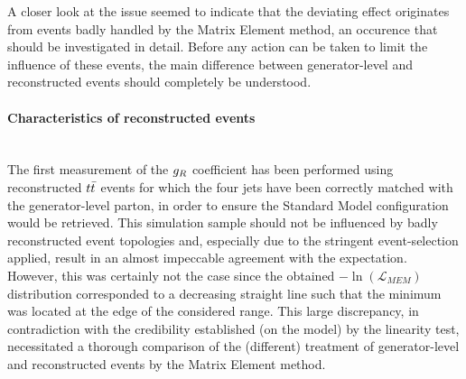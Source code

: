 A closer look at the issue seemed to indicate that the deviating effect originates from events badly handled by the Matrix Element method, an occurence that should be investigated in detail.
Before any action can be taken to limit the influence of these events, the main difference between generator-level and reconstructed events should completely be understood.
%

\paragraph{Characteristics of reconstructed events} \hfill \\ %

The first measurement of the $g_{R}$ coefficient has been performed using reconstructed $t\bar{t}$ events for which the four jets have been correctly matched with the generator-level parton, in order to ensure the Standard Model configuration would be retrieved. This simulation sample should not be influenced by badly reconstructed event topologies and, especially due to the stringent event-selection applied, result in an almost impeccable agreement with the expectation.
\\
However, this was certainly not the case since the obtained $-\ln(\mathcal{L}_{MEM})$ distribution corresponded to a decreasing straight line such that the minimum was located at the edge of the considered range. This large discrepancy, in contradiction with the credibility established (on the model) by the linearity test, necessitated a thorough comparison of the (different) treatment of generator-level and reconstructed events by the Matrix Element method.
\\

